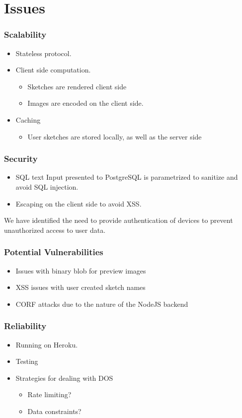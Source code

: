 \documentclass{beamer}
\begin{document}
  \section{Issues}
  \begin{frame}
    \frametitle{Scalability}
      \begin{itemize}
        \item Stateless protocol.
        \item Client side computation.
        \begin{itemize}
          \item Sketches are rendered client side
          \item Images are encoded on the client side.
        \end{itemize}
        \item Caching
        \begin{itemize}
    	     \item User sketches are stored locally, as well as the server side
        \end{itemize}
       \end{itemize}
  \end{frame}

  \begin{frame}
    \frametitle{Security}
    \begin{itemize}
      \item SQL text Input presented to PostgreSQL is parametrized to sanitize and avoid SQL injection.
      \item Escaping on the client side to avoid XSS.
    \end{itemize}
    We have identified the need to provide authentication of devices to prevent unauthorized access to  user data.
  \end{frame}

  \begin{frame}
    \frametitle{Potential Vulnerabilities}
    \begin{itemize}
      \item Issues with binary blob for preview images
      \item XSS issues with user created sketch names
      \item CORF attacks due to the nature of the NodeJS backend
    \end{itemize}
  \end{frame}

  \begin{frame}
    \frametitle{Reliability}
    \begin{itemize}
      \item Running on Heroku.
      \item Testing
      \item Strategies for dealing with DOS
        \begin{itemize}
          \item Rate limiting?
          \item Data constraints?
        \end{itemize}
    \end{itemize}
  \end{frame}
\end{document}
